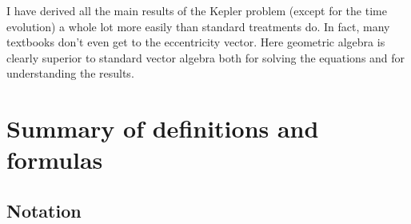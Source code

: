 \documentclass{utarticle}
\begin{document}
I have derived all the main results of the Kepler problem (except for the time evolution) 
a whole lot more easily than standard treatments do.  In fact, many textbooks don't 
even get to the eccentricity vector.  Here geometric algebra is clearly superior to standard 
vector algebra both for solving the equations and for understanding the results.

\appendix

\section{Summary of definitions and formulas}
\label{app:summary}

\setcounter{axiom}{0}
\setcounter{equation}{0}

\subsection{Notation}
\label{app:notation}
\end{document}
